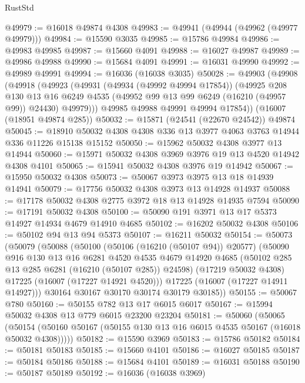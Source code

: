 \begin{lexlean}{RustStd}
\begin{coremodule}
@49979 := @16018 @49874 @4308
@49983 := @49941 (@49944 (@49962 (@49977 @49979)))
@49984 := @15590 @3035
@49985 := @15786 @49984
@49986 := @49983 @49985
@49987 := @15660 @4091
@49988 := @16027 @49987
@49989 := @49986 @49988
@49990 := @15684 @4091
@49991 := @16031 @49990
@49992 := @49989 @49991
@49994 := @16036 (@16038 @3035)
@50028 := @49903
    (@49908
      (@49918
        (@49923
          (@49931
            (@49934 (@49992 @49994 @17854))
            (@49925
              @208
              @130
              @13
              @16
              @6249
              @4535
              (@49952 @99 @13 @99 @6249 (@16210 (@49957 @99)) @24430)
              @49979)))
        @49985
        @49988
        @49991
        @49994
        @17854))
    (@16007 (@18951 @49874 @285))
@50032 := @15871 (@24541 (@22670 @24542)) @49874
@50045 := @18910 @50032 @4308 @4308 @336 @13 @3977 @4063 @3763 @14944 @336 @11226 @15138 @15152
@50050 := @15962 @50032 @4308 @3977 @13 @14944
@50060 := @15971 @50032 @4308 @3969 @3976 @19 @13 @4520 @14942 @4308 @4101
@50065 := @15941 @50032 @4308 @3976 @19 @14942
@50067 := @15950 @50032 @4308
@50073 := @50067 @3973 @3975 @13 @18 @14939 @14941
@50079 := @17756 @50032 @4308 @3973 @13 @14928 @14937
@50088 := @17178 @50032 @4308 @2775 @3972 @18 @13 @14928 @14935 @7594
@50090 := @17191 @50032 @4308
@50100 := @50090 @191 @3971 @13 @17 @5373 @14927 @14934 @4679 @14910 @4685
@50102 := @16202 @50032 @4308
@50106 := @50102 @94 @13 @94 @5373
@50107 := @16211 @50032
@50154 := @50073
    (@50079
      (@50088
        (@50100
          (@50106 (@16210 (@50107 @94)) @20577)
          (@50090
            @916
            @130
            @13
            @16
            @6281
            @4520
            @4535
            @4679
            @14920
            @4685
            (@50102 @285 @13 @285 @6281 (@16210 (@50107 @285)) @24598)
            (@17219 @50032 @4308)
            @17225
            (@16007 (@17227 @14921 @4520)))
          @17225
          (@16007 (@17227 @14911 @14927)))
        @30164
        @30167
        @30170
        @30174
        @30179
        @30185))
@50155 := @50067 @780
@50160 := @50155 @782 @13 @17 @6015 @6017
@50167 := @15994 @50032 @4308 @13 @779 @6015 @23200 @23204
@50181 := @50060
    (@50065 (@50154 (@50160 @50167 (@50155 @130 @13 @16 @6015 @4535 @50167 (@16018 @50032 @4308)))))
@50182 := @15590 @3969
@50183 := @15786 @50182
@50184 := @50181 @50183
@50185 := @15660 @4101
@50186 := @16027 @50185
@50187 := @50184 @50186
@50188 := @15684 @4101
@50189 := @16031 @50188
@50190 := @50187 @50189
@50192 := @16036 (@16038 @3969)

\end{coremodule}
\end{lexlean}
